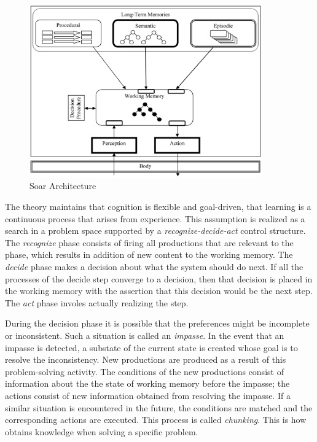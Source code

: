 \begin{figure}[htp]
  \centering
  \includegraphics[width=100mm]{soar}
  \caption{Soar Architecture\cite{Jill-Fain-Lehman:2006aa}}
  \label{SOAR_ARCH}
\end{figure}

The \soar theory maintains that cognition is flexible and goal-driven,
that learning is a continuous process that arises from experience. This assumption
is realized as a search in a problem space supported by a
\emph{recognize-decide-act} control structure\cite{Lewis:2001aa}. The
{\em recognize} phase consists of firing all productions that are relevant
to the phase, which results in addition of new content to the working
memory. The {\em decide} phase makes a decision about what the system should
do next. If all the processes of the decide step converge to a
decision, then that decision is placed in the working memory with the
assertion that this decision would be the next step. The {\em act} phase
involes actually realizing the step. 
 
During the decision phase it is possible that the
preferences might be incomplete or inconsistent. Such a situation is
called an \emph{impasse}. In the event that an impasse is detected, a
substate of the current state is created whose goal is to resolve the
inconsistency. New productions are produced as a result of this
problem-solving activity. The conditions of the new productions
consist of information about the the state of working memory before the
impasse; the actions consist of  new information obtained from
resolving the impasse. If a similar situation is encountered in the
future, the conditions are matched and the corresponding actions are
executed.  This process is called \emph{chunking}.  This is how
\soar obtains knowledge when solving a specific problem.

